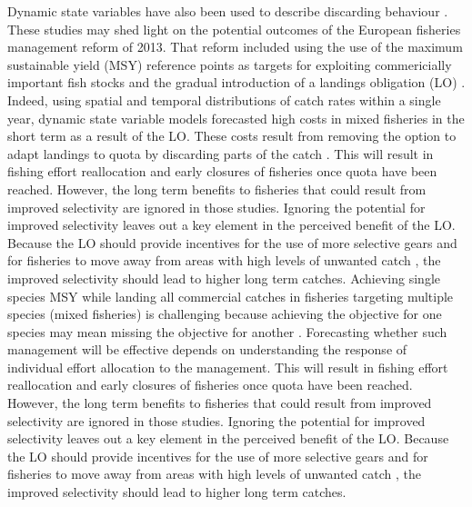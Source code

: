 \documentclass[12pt,oneline,a4paper,numbib]{ouparticle}
\numberwithin{equation}{subsection} %
\begin{document}
Dynamic state variables have also been used to describe discarding behaviour \cite{Batsleer2015, Batsleer2013, Gillis1995}. These studies may shed light on the potential outcomes of the European fisheries management reform of 2013. That reform included using the use of the maximum sustainable yield (MSY) reference points as targets for exploiting commericially important fish stocks and the gradual introduction of a landings obligation (LO) \cite{CFP2013}. Indeed, using spatial and temporal distributions of catch rates within a single year, dynamic state variable models forecasted  high costs in mixed fisheries in the short term as a result of the LO. These costs result from removing the option to adapt landings to quota by discarding parts of the catch \cite{Alzorriz2018}. This will result in fishing effort reallocation and early closures of fisheries once quota have been reached. However, the long term benefits to fisheries that could result from improved selectivity are ignored in those studies. Ignoring the potential for improved selectivity leaves out a key element in the perceived benefit of the LO. Because the LO should provide incentives for the use of more selective gears and for fisheries to  move away from areas with high levels of unwanted catch \cite{Alzorriz2016, Alzorriz2018}, the improved selectivity should lead to higher long term catches. Achieving single species MSY while landing all commercial catches in fisheries targeting multiple species (mixed fisheries) is challenging because achieving the objective for one species may mean missing the objective for another \cite{Batsleer2013, Ulrich2017}. Forecasting whether such management will be effective depends on understanding the response of individual effort allocation to the management.
This will result in fishing effort reallocation and early closures of fisheries once quota have been reached. However, the long term benefits to fisheries that could result from improved selectivity are ignored in those studies. Ignoring the potential for improved selectivity leaves out a key element in the perceived benefit of the LO. Because the LO should provide incentives for the use of more selective gears and for fisheries to  move away from areas with high levels of unwanted catch \cite{Alzorriz2016, Alzorriz2018}, the improved selectivity should lead to higher long term catches. 
\end{document}
